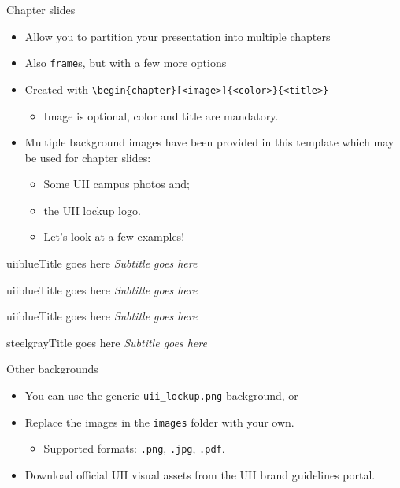 \begin{frame}[fragile]{Chapter slides}
\begin{itemize}
\item Allow you to partition your presentation into multiple chapters
\item Also \verb|frame|s, but with a few more options
\item Created with \verb|\begin{chapter}[<image>]{<color>}{<title>}|
  \begin{itemize}
  \item Image is optional, color and title are mandatory.
  \end{itemize}
\item Multiple background images have been provided in this template which may be used for chapter slides:
  \begin{itemize}
  \item Some UII campus photos and;
  \item the UII lockup logo.
  \item Let's look at a few examples!
  \end{itemize}
\end{itemize}
\end{frame}


\begin{chapter}{uiiblue}{Title goes here}
\textit{Subtitle goes here}
\end{chapter}

\begin{chapter}{uiiblue}{Title goes here}
\textit{Subtitle goes here}
\end{chapter}

\begin{chapter}{uiiblue}{Title goes here}
\textit{Subtitle goes here}
\end{chapter}

\begin{chapter}{steelgray}{Title goes here}
\textit{Subtitle goes here}
\end{chapter}

\begin{frame}[fragile]{Other backgrounds}
\begin{itemize}
\item You can use the generic \verb|uii_lockup.png| background, or
\item Replace the images in the \verb|images| folder with your own.
    \begin{itemize}
    \item Supported formats: \verb|.png|, \verb|.jpg|, \verb|.pdf|.
    \end{itemize}
\item Download official UII visual assets from the UII brand guidelines portal.
\end{itemize}
\end{frame}


